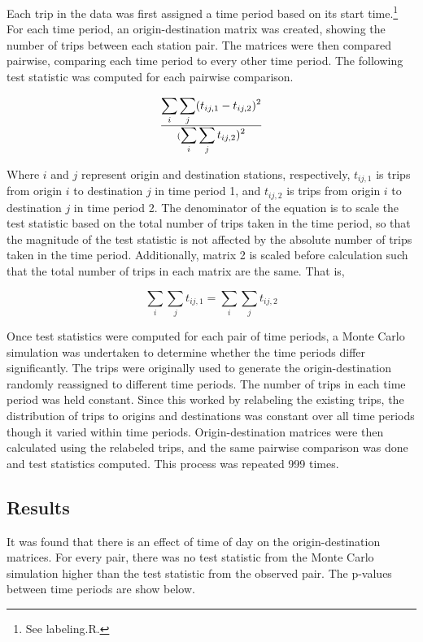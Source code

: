 \documentclass[letterpaper,11pt]{article}
\begin{document}
Each trip in the data was first assigned a time period based on its
start time.\footnote{See labeling.R.} For each time period, an origin-destination matrix was
created, showing the number of trips between each station pair. The
matrices were then compared pairwise, comparing each time period to
every other time period. The following test statistic was computed for
each pairwise comparison.

\begin{equation}\label{eq:timets}
 \displaystyle\sum_i \sum_j (t_{ij,1} - t_{ij,2})^2 \over
 (\displaystyle \sum_i \sum_j t_{ij,2})^2
\end{equation}

Where $i$ and $j$ represent origin and destination stations,
respectively, $t_{ij,1}$ is trips from origin $i$ to destination $j$
in time period 1, and $t_{ij,2}$ is trips from origin $i$ to
destination $j$ in time period 2. The denominator of the equation is
to scale the test statistic based on the total number of trips taken
in the time period, so that the magnitude of the test statistic is not
affected by the absolute number of trips taken in the time
period. Additionally, matrix 2 is scaled before calculation such
that the total number of trips in each matrix are the same. That is,

\begin{equation}\label{eq:timeconstraint}
  \displaystyle \sum_i \sum_j t_{ij,1} = \sum_i \sum_j t_{ij,2}
\end{equation}

Once test statistics were computed for each pair of time periods, a
Monte Carlo simulation was undertaken to determine whether the time
periods differ significantly. The trips were originally used to
generate the origin-destination randomly reassigned to different time
periods. The number of trips in each time period was held
constant. Since this worked by relabeling the existing trips, the
distribution of trips to origins and destinations was constant over
all time periods though it varied within time
periods. Origin-destination matrices were then calculated using the
relabeled trips, and the same pairwise comparison was done and test
statistics computed. This process was repeated 999 times.

\subsection{Results}

It was found that there is an effect of time of day on the
origin-destination matrices. For every pair, there was no test
statistic from the Monte Carlo simulation higher than the test statistic
from the observed pair. The p-values between time periods are show below.
\end{document}
